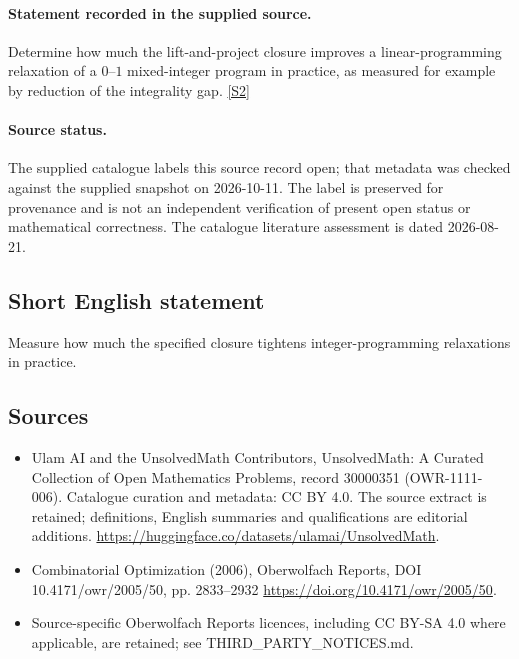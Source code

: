 \documentclass[11pt]{article}
\begin{document}
\paragraph{Statement recorded in the supplied source.}
Determine how much the lift-and-project closure improves a linear-programming relaxation of a $0$–$1$ mixed-integer program in practice, as measured for example by reduction of the integrality gap. \href{https://doi.org/10.4171/owr/2005/50}{[S2]}
\paragraph{Source status.}
The supplied catalogue labels this source record open; that metadata was checked against the supplied snapshot on 2026-10-11. The label is preserved for provenance and is not an independent verification of present open status or mathematical correctness. The catalogue literature assessment is dated 2026-08-21.
\subsection{Short English statement}
Measure how much the specified closure tightens integer-programming relaxations in practice.
\subsection{Sources}
\begin{itemize}
\item[S1] Ulam AI and the UnsolvedMath Contributors, UnsolvedMath: A Curated Collection of Open Mathematics Problems, record 30000351 (OWR-1111-006). Catalogue curation and metadata: CC BY 4.0. The source extract is retained; definitions, English summaries and qualifications are editorial additions.
\url{https://huggingface.co/datasets/ulamai/UnsolvedMath}.
\item[S2] Combinatorial Optimization (2006), Oberwolfach Reports, DOI 10.4171/owr/2005/50, pp. 2833--2932
\url{https://doi.org/10.4171/owr/2005/50}.
\item Source-specific Oberwolfach Reports licences, including CC BY-SA 4.0 where applicable, are retained; see THIRD\_PARTY\_NOTICES.md.
\end{itemize}
\end{document}
